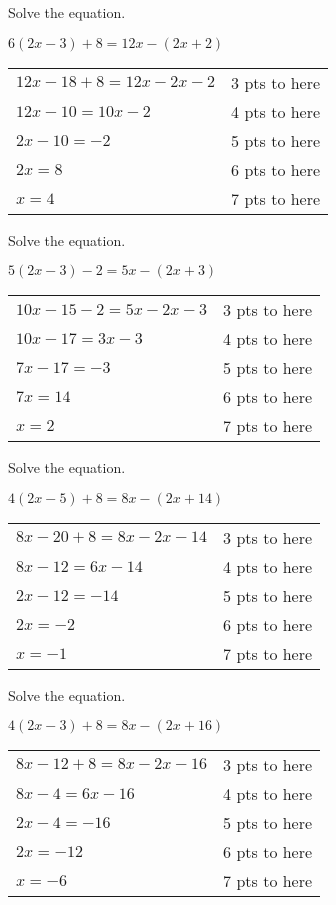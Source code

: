 {
	Solve the equation.
	
	$6(2x-3)+8=12x-(2x+2)$
}
{
	\begin{tabular}{l r}
	$12x-18+8=12x-2x-2$ & 3 pts to here\\
	$12x-10=10x-2$ & 4 pts to here\\
	$2x-10=-2$ & 5 pts to here\\
	$2x=8$ & 6 pts to here\\
	$x=4$ & 7 pts to here
	\end{tabular}
}

{
	Solve the equation.
	
	$5(2x-3)-2=5x-(2x+3)$
}
{
	\begin{tabular}{l r}
	$10x-15-2=5x-2x-3$ & 3 pts to here\\
	$10x-17=3x-3$ & 4 pts to here\\
	$7x-17=-3$ & 5 pts to here\\
	$7x=14$ & 6 pts to here\\
	$x=2$ & 7 pts to here
	\end{tabular}
}

{
	Solve the equation.
	
	$4(2x-5)+8=8x-(2x+14)$
}
{
	\begin{tabular}{l r}
	$8x-20+8=8x-2x-14$ & 3 pts to here\\
	$8x-12=6x-14$ & 4 pts to here\\
	$2x-12=-14$ & 5 pts to here\\
	$2x=-2$ & 6 pts to here\\
	$x=-1$ & 7 pts to here
	\end{tabular}
}

{
	Solve the equation.
	
	$4(2x-3)+8=8x-(2x+16)$
}
{
	\begin{tabular}{l r}
	$8x-12+8=8x-2x-16$ & 3 pts to here\\
	$8x-4=6x-16$ & 4 pts to here\\
	$2x-4=-16$ & 5 pts to here\\
	$2x=-12$ & 6 pts to here\\
	$x=-6$ & 7 pts to here
	\end{tabular}
}
